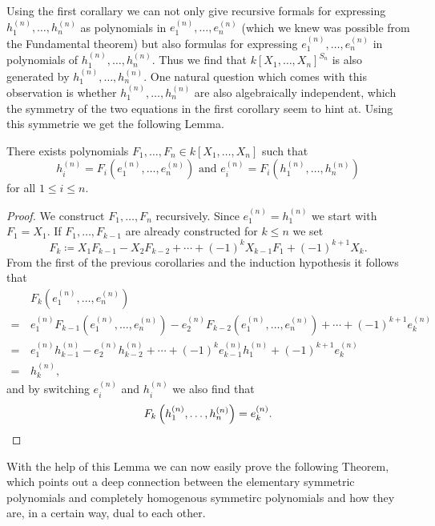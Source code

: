 Using the first corallary we can not only give recursive formals for expressing $h^{(n)}_1, \dotsc, h^{(n)}_n$ as polynomials in $e^{(n)}_1, \dotsc, e^{(n)}_n$ (which we knew was possible from the Fundamental theorem) but also formulas for expressing $e^{(n)}_1, \dotsc, e^{(n)}_n$ in polynomials of $h^{(n)}_1, \dotsc, h^{(n)}_n$.
Thus we find that $k[X_1, \dotsc, X_n]^{S_n}$ is also generated by $h^{(n)}_1, \dotsc, h^{(n)}_n$.
One natural question which comes with this observation is whether $h^{(n)}_1, \dotsc, h^{(n)}_n$ are also algebraically independent, which the symmetry of the two equations in the first corollary seem to hint at.
Using this symmetrie we get the following Lemma.


\begin{lem}
  There exists polynomials $F_1, \dotsc, F_n \in k[X_1, \dotsc, X_n]$ such that
  \[
      h^{(n)}_i
    = F_i\left(e^{(n)}_1, \dotsc, e^{(n)}_n\right)
    \text{ and }
      e^{(n)}_i
    = F_i\left(h^{(n)}_1, \dotsc, h^{(n)}_n\right)
  \]
  for all $1 \leq i \leq n$.
\end{lem}
\begin{proof}
  We construct $F_1, \dotsc, F_n$ recursively.
  Since $e^{(n)}_1 = h^{(n)}_1$ we start with $F_1 = X_1$.
  If $F_1, \dotsc, F_{k-1}$ are already constructed for $k \leq n$ we set
  \[
              F_k
    \coloneqq   X_1 F_{k-1}
              - X_2 F_{k-2}
              + \dotsb
              + (-1)^k X_{k-1} F_1
              + (-1)^{k+1} X_k.
  \]
  From the first of the previous corollaries and the induction hypothesis it follows that
  \begin{align*}
     &\,  F_k\left(e^{(n)}_1, \dotsc, e^{(n)}_n\right) \\
    =&\,    e^{(n)}_1 F_{k-1}\left( e^{(n)}_1, \dotsc, e^{(n)}_n \right)
          - e^{(n)}_2 F_{k-2}\left( e^{(n)}_1, \dotsc, e^{(n)}_n \right)
          + \dotsb
          + (-1)^{k+1} e^{(n)}_k \\
    =&\,    e^{(n)}_1 h^{(n)}_{k-1}
          - e^{(n)}_2 h^{(n)}_{k-2}
          + \dotsb
          + (-1)^k e^{(n)}_{k-1} h^{(n)}_1
          + (-1)^{k+1} e^{(n)}_k \\
    =&\,  h^{(n)}_k,
  \end{align*}
  and by switching $e^{(n)}_i$ and $h^{(n)}_i$ we also find that
  \[
      F_k\left(h^{(n)}_1, \dotsc, h^{(n)}_n\right)
    = e^{(n)}_k.
    \qedhere
  \]
\end{proof}


With the help of this Lemma we can now easily prove the following Theorem, which points out a deep connection between the elementary symmetric polynomials and completely homogenous symmetirc polynomials and how they are, in a certain way, dual to each other.


